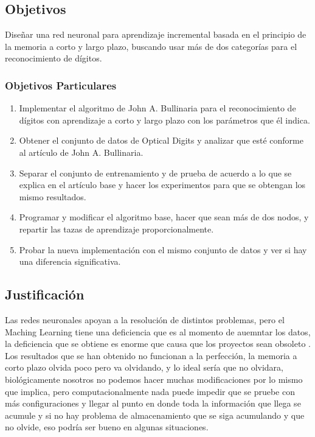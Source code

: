 \subsection{Objetivos}
Diseñar una red neuronal para aprendizaje incremental basada en el principio de la memoria a corto y largo plazo, buscando usar más de dos categorías para el reconocimiento de dígitos.
\subsubsection{Objetivos Particulares}
    \begin{enumerate}
        \item Implementar el algoritmo de John A. Bullinaria para el reconocimiento de dígitos con aprendizaje a corto y largo plazo con los parámetros que él indica.
        \item Obtener el conjunto de datos de Optical Digits y analizar que esté conforme al artículo de John A. Bullinaria.
        \item Separar el conjunto de entrenamiento y de prueba de acuerdo a lo que se explica en el artículo base y hacer los experimentos para que se obtengan los mismo resultados.
        \item Programar y modificar el algoritmo base, hacer que sean más de dos nodos, y repartir las tazas de aprendizaje proporcionalmente.
        \item Probar la nueva implementación con el mismo conjunto de datos y ver si hay una diferencia significativa.
    \end{enumerate}
\subsection{Justificaci\'on}

Las redes neuronales apoyan a la resoluci\'on de distintos problemas, pero el Maching Learning tiene una deficiencia que es al momento de auemntar los datos, la deficiencia que se obtiene es enorme que causa que los proyectos sean obsoleto \cite{Bullinaria2009}. Los resultados que se han obtenido no funcionan a la perfección, la memoria a corto plazo olvida poco pero va olvidando,
y lo ideal sería que no olvidara, biológicamente nosotros no podemos hacer muchas modificaciones \cite{TRAMONINEGRE2017} por lo mismo que implica, pero computacionalmente nada puede impedir que se pruebe con más configuraciones y llegar al punto en donde toda la información que llega se acumule y si no hay problema de almacenamiento que se siga acumulando y que no olvide, eso podría ser bueno en algunas situaciones.

